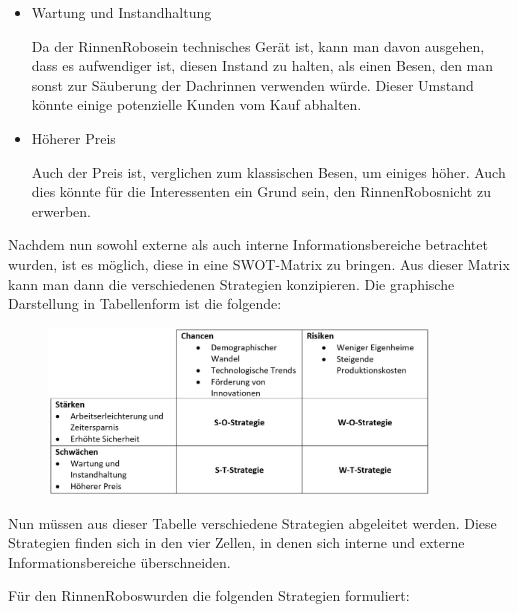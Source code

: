     \begin{itemize}
        \item Wartung und Instandhaltung

            Da der \as RinnenRobos\adl ein technisches Gerät ist, kann man davon ausgehen, dass es aufwendiger ist,
            diesen Instand zu halten, als einen Besen, den man sonst zur Säuberung der Dachrinnen verwenden würde.
            Dieser Umstand könnte einige potenzielle Kunden vom Kauf abhalten.
        \item Höherer Preis
        
            Auch der Preis ist, verglichen zum klassischen Besen, um einiges höher. Auch dies könnte für die
            Interessenten ein Grund sein, den \as RinnenRobos\adl nicht zu erwerben.
    \end{itemize}

\noindent Nachdem nun sowohl externe als auch interne Informationsbereiche betrachtet wurden, ist es möglich, diese in
eine SWOT-Matrix zu bringen. Aus dieser Matrix kann man dann die verschiedenen Strategien konzipieren. Die graphische
Darstellung in Tabellenform ist die folgende:

    \begin{figure}[ht]
        \centering
        \includegraphics[width = 0.9\textwidth]{Eigene Darstellungen/SWOT Tabelle.jpg}
    \end{figure}

\noindent Nun müssen aus dieser Tabelle verschiedene Strategien abgeleitet werden. Diese Strategien finden sich in den
vier Zellen, in denen sich interne und externe Informationsbereiche überschneiden.

\noindent Für den \as RinnenRobos\adl wurden die folgenden Strategien formuliert:

